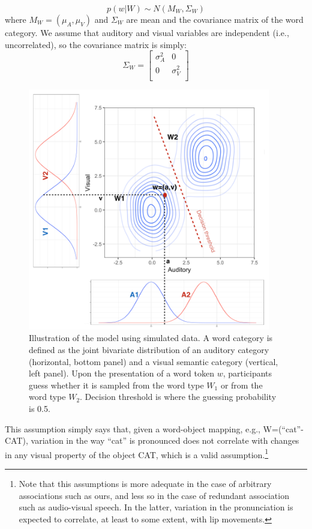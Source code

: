 \documentclass[english,man]{apa6}
\theoremstyle{definition}
\theoremstyle{definition}
\theoremstyle{definition}
\theoremstyle{remark}
\begin{document}
\[ p(w | W) \sim  N(M_W, \Sigma_W) \] where \(M_W=(\mu_A, \mu_V)\) and
\(\Sigma_W\) are mean and the covariance matrix of the word category. We
assume that auditory and visual variables are independent (i.e.,
uncorrelated), so the covariance matrix is simply: \[
   \Sigma_W=
  \left[ {\begin{array}{cc}
   \sigma^2_A & 0 \\
   0 & \sigma^2_V \\
  \end{array} } \right]
\]

\begin{figure}

{\centering \includegraphics[width=400px]{pictures/model} 

}

\caption{Illustration of the model using simulated data. A word category is defined as the joint bivariate distribution of an auditory category (horizontal, bottom panel) and a visual semantic category (vertical, left panel). Upon the presentation of a word token $w$, participants guess whether it is sampled from the word type $W_1$ or from the word type $W_2$. Decision threshold is where the guessing probability is 0.5.}\label{fig:model}
\end{figure}

This assumption simply says that, given a word-object mapping, e.g.,
W=(\enquote{cat}-CAT), variation in the way \enquote{cat} is pronounced
does not correlate with changes in any visual property of the object
CAT, which is a valid
assumption.\footnote{Note that this assumptions is more adequate in the case of arbitrary associations such as ours, and less so in the case of redundant association such as audio-visual speech. In the latter, variation in the pronunciation is expected to correlate, at least to some extent, with lip movements.}
\end{document}
